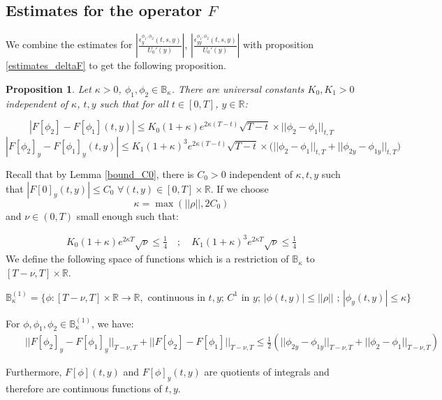 \documentclass[11pt, psfig]{article}
\newtheorem{proposition}[theorem]{Proposition}
\theoremstyle{definition}
\theoremstyle{remark}
\numberwithin{equation}{section}
\def\sR{\mathbb{R}}
\def\sR{\mathbb{R}}
\newcommand{\be}{\begin{equation}}
\newcommand{\ee}{\end{equation}}
\begin{document}
\subsection*{Estimates for the operator $F$}
We combine the estimates for $|\frac{ \epsilon_{y}^{\phi_1,\phi_2}(t,s,y)}{U_0'(y)}|$, $|\frac{ \epsilon_{yy}^{\phi_1,\phi_2}(t,s,y)}{U_0'(y)}|$ with proposition \ref{estimates_deltaF} to get the following proposition.





\begin{proposition}
Let $\kappa>0$, $\phi_1, \phi_2 \in \mathbb{B}_{\kappa}$.
There are universal constants $K_0, K_1>0$ independent of $\kappa$, $t, y$ such that for all $t\in [0,T]$, $ y\in \sR$:

\be |F[\phi_2]-F[\phi_1](t,y)| \leq K_0 (1+\kappa)e^{2\kappa(T-t)} \sqrt{T-t} \times  ||\phi_2- \phi_1||_{t,T}
\ee
\be
|F[\phi_2]_y-F[\phi_1]_y(t,y)| \leq  K_1(1+\kappa)^3 e^{2\kappa(T-t)} \sqrt{T-t} \times \big(||\phi_2-\phi_1||_{t,T} + ||\phi_{2y}-\phi_{1y}||_{t,T} \big)
\ee
\end{proposition}


Recall that by Lemma \ref{bound_C0}, there is $C_0>0$ independent of $\kappa, t, y$ such that $|F[0]_y(t,y) | \leq C_0$ $\forall (t,y)\in [0,T]\times \sR$.
If we choose 
\be
\kappa = \max(||\rho||, 2 C_0)
 \ee
and $\nu \in (0,T)$ small enough such that:

\begin{eqnarray}
K_0 (1+\kappa)e^{2\kappa T} \sqrt{\nu} \leq \frac{1}{4}\quad ; \quad  K_1(1+\kappa)^3 e^{2\kappa T} \sqrt{\nu} \leq  \frac{1}{4}
\end{eqnarray}
We define the following space of functions which is a restriction of $\mathbb{B}_{\kappa}$ to $[T-\nu, T]\times \sR$.

\be  \label{BK_1}
\mathbb{B}_{\kappa}^{(1)} = \{ \phi:[T-\nu,T]\times \sR \rightarrow \sR,  \textrm{ continuous in $t,y$;  $C^1$ in $y$; $|\phi(t,y)|\leq ||\rho||$ ; $|\phi_y(t,y)|\leq \kappa$} \}
\ee

For $\phi, \phi_1, \phi_2 \in \mathbb{B}_{\kappa}^{(1)}$, we have:
\begin{eqnarray*}
&&||F[\phi_2]_y-F[\phi_1]_y||_{T-\nu, T} + ||F[\phi_2]-F[\phi_1]||_{T-\nu, T}   \leq \frac{1}{2}( ||\phi_{2y}-\phi_{1y}||_{T-\nu, T} +  ||\phi_{2}-\phi_{1}||_{T-\nu, T} )
 \end{eqnarray*}

Furthermore, 
$F[\phi](t,y)$ and $F[\phi]_y(t,y)$ are quotients of integrals and therefore are continuous functions of $t, y$.
\end{document}
